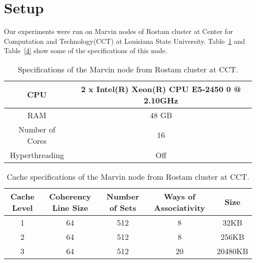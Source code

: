 \section{Setup}
Our experiments were run on Marvin nodes of Rostam cluster at Center for Computation and Technology(CCT) at Louisiana State University. Table~\ref{table3} and Table~\ref{4} show some of the specifications of this node.

\vspace{\baselineskip}	
\begin{table}[H]
	\centering
	\scalebox{0.75}
	{\begin{tabular}{|c | c |} 
			\hline
			CPU &  2 x Intel(R) Xeon(R) CPU E5-2450 0 @ 2.10GHz \\ [0.5ex] 
			\hline
			RAM & 48 GB\\ 	
			\hline
			Number of Cores & 16\\
			\hline	
			Hyperthreading & Off \\
			\hline			
	\end{tabular}}	
	\caption{Specifications of the Marvin node from Rostam cluster at CCT.}
	\label{table3}
\end{table} 


\vspace{\baselineskip}	
\begin{table}[H]
	\centering
	\scalebox{0.9}
	{\begin{tabular}{|c | c | c | c | c|} 
			\hline
			Cache Level &  Coherency Line Size & Number of Sets & Ways of Associativity & Size\\ [0.5ex] 
			\hline
			1 & 64 & 512 & 8 & 32KB \\	
			\hline
			2 & 64 & 512 & 8 & 256KB \\
			\hline	
			3 & 64 & 512 & 20 & 20480KB \\
			\hline			
	\end{tabular}}	
	\caption{Cache specifications of the Marvin node from Rostam cluster at CCT.}
	\label{table4}
\end{table} 
\vspace{\baselineskip}	

